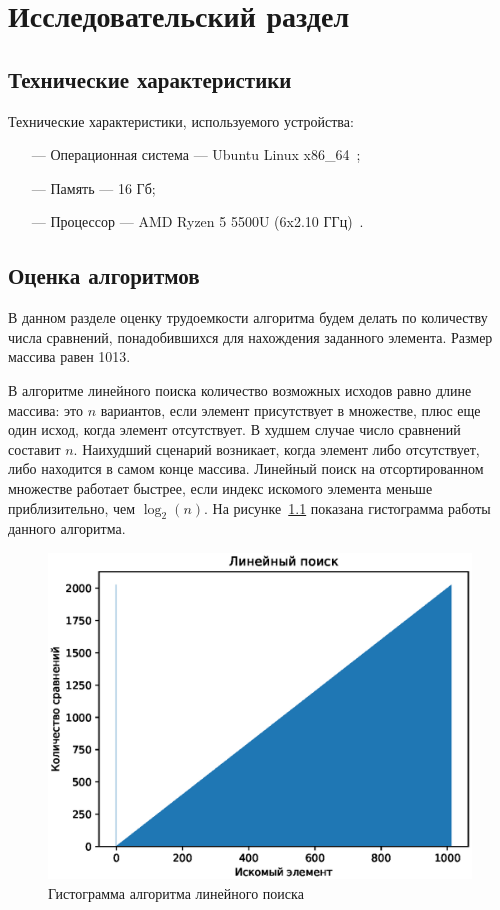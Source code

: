 \chapter{Исследовательский раздел}

\section{Технические характеристики}
Технические характеристики, используемого устройства:
\begin{itemize}
    \item[---] Операционная система --- Ubuntu Linux x86\_64~\cite{Ubuntu};
    \item[---] Память --- 16 Гб;
    \item[---] Процессор --- AMD Ryzen 5 5500U (6x2.10 ГГц)~\cite{AMD}.
\end{itemize}

\section{Оценка алгоритмов}
В данном разделе оценку трудоемкости алгоритма будем делать по количеству числа сравнений, понадобившихся для нахождения заданного элемента. Размер массива равен 1013.

В алгоритме линейного поиска количество возможных исходов равно длине массива: это $n$ вариантов, если элемент присутствует в множестве, плюс еще один исход, когда элемент отсутствует. В худшем случае число сравнений составит $n$. Наихудший сценарий возникает, когда элемент либо отсутствует, либо находится в самом конце массива. Линейный поиск на отсортированном множестве работает быстрее, если индекс искомого элемента меньше приблизительно, чем $\log_2(n)$. На рисунке~\ref{fig:Gist_Liniar} показана гистограмма работы данного алгоритма.

\begin{figure}[h]
	\centering
	\includegraphics[]{img/Figure_1.eps}
	\caption{Гистограмма алгоритма линейного поиска}
	\label{fig:Gist_Liniar}
\end{figure}


